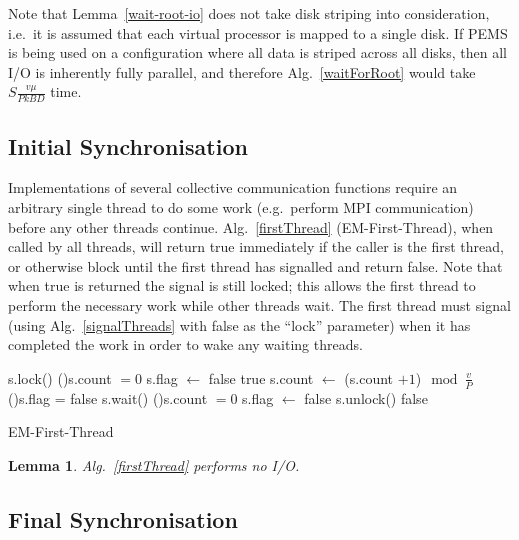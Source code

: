 \documentclass[12pt]{carletoncsthesis}
\newtheorem{lemma}[thm]{Lemma}
\begin{document}
Note that Lemma~\ref{wait-root-io} does not take disk striping into
consideration, i.e.\ it is assumed that each virtual processor is mapped to
a single disk.  If PEMS is being used on a configuration where all data
is striped across all disks, then all I/O is inherently fully parallel,
and therefore Alg.~\ref{waitForRoot} would take $S\frac{v\mu}{PkBD}$ time.

\subsection{Initial Synchronisation}


Implementations of several collective communication functions require an
arbitrary single thread to do some work (e.g.\ perform MPI communication) before
any other threads continue.  Alg.~\ref{firstThread} ({\sc EM-First-Thread}),
when called by all threads, will return true immediately if the caller is the
first thread, or otherwise block until the first thread has signalled and
return false.  Note that when true is returned the signal is still locked;
this allows the first thread to perform the necessary work while other
threads wait.  The first thread must signal (using Alg.~\ref{signalThreads}
with false as the ``lock'' parameter) when it has completed the work in
order to wake any waiting threads.

\begin{algorithm}[h]
	\BlankLine
	s.lock()\;
	\If(){s.count $= 0$}{
		s.flag $\longleftarrow$ false\;
		\Return true\;
	}
	s.count $\longleftarrow$ (s.count $+ 1$)$\mod \frac{v}{P}$\;
	\If(){s.flag = false}{
		s.wait()\;
	}
	\If(){s.count $= 0$}{
		s.flag $\longleftarrow$ false\;
	}
	s.unlock()\;
	\Return false\;
	\caption{\sc EM-First-Thread}
	\label{firstThread}
\end{algorithm}

\begin{lemma}
\label{first-io}
Alg.~\ref{firstThread} performs no I/O.
\end{lemma}

\subsection{Final Synchronisation}
\end{document}
